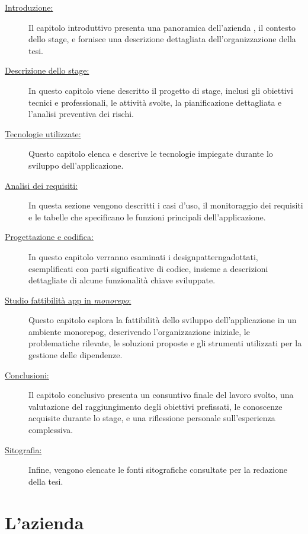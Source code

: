 \begin{description}
    \item[{\hyperref[chap:introduzione]{Introduzione:}}] Il capitolo introduttivo presenta una panoramica dell'azienda \myAzienda, il contesto dello stage, e fornisce una descrizione dettagliata dell'organizzazione della tesi.
    \item[{\hyperref[chap:stage_descrizione]{Descrizione dello stage:}}] In questo capitolo viene descritto il progetto di stage, inclusi gli obiettivi tecnici e professionali, le attività svolte, la pianificazione dettagliata e l'analisi preventiva dei rischi.
    \item[{\hyperref[chap:tecnologie_utilizzate]{Tecnologie utilizzate:}}] Questo capitolo elenca e descrive le tecnologie impiegate durante lo sviluppo dell'applicazione.
    \item[{\hyperref[chap:analisi_requisiti]{Analisi dei requisiti:}}] In questa sezione vengono descritti i casi d'uso, il monitoraggio dei requisiti e le tabelle che specificano le funzioni principali dell'applicazione.
    \item[{\hyperref[chap:design_coding]{Progettazione e codifica:}}] In questo capitolo verranno esaminati i \gls{designpatterng}\glox adottati, esemplificati con parti significative di codice, insieme a descrizioni dettagliate di alcune funzionalità chiave sviluppate.
    \item[{\hyperref[chap:studio_fattibilita]{Studio fattibilità app in \textit{monorepo}:}}] Questo capitolo esplora la fattibilità dello sviluppo dell'applicazione in un ambiente \gls{monorepog}\glox, descrivendo l'organizzazione iniziale, le problematiche rilevate, le soluzioni proposte e gli strumenti utilizzati per la gestione delle dipendenze.
    \item[{\hyperref[chap:conclusioni]{Conclusioni:}}] Il capitolo conclusivo presenta un consuntivo finale del lavoro svolto, una valutazione del raggiungimento degli obiettivi prefissati, le conoscenze acquisite durante lo stage, e una riflessione personale sull'esperienza complessiva.
    \item[{\hyperref[cap:webbliography]{Sitografia:}}] Infine, vengono elencate le fonti sitografiche consultate per la redazione della tesi.
\end{description}
\pagebreak
\section{L'azienda}

